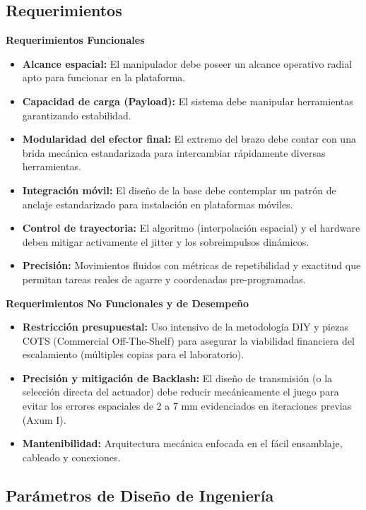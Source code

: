 \documentclass[12pt, a4paper]{article}
\begin{document}
\subsection{Requerimientos}

\textbf{Requerimientos Funcionales}
\begin{itemize}
    \item \textbf{Alcance espacial:} El manipulador debe poseer un alcance operativo radial apto para funcionar en la plataforma. 
    \item \textbf{Capacidad de carga (Payload):} El sistema debe manipular herramientas garantizando estabilidad.
    \item \textbf{Modularidad del efector final:} El extremo del brazo debe contar con una brida mecánica estandarizada para intercambiar rápidamente diversas herramientas.
    \item \textbf{Integración móvil:} El diseño de la base debe contemplar un patrón de anclaje estandarizado para instalación en plataformas móviles.
    \item \textbf{Control de trayectoria:} El algoritmo (interpolación espacial) y el hardware deben mitigar activamente el jitter y los sobreimpulsos dinámicos.
    \item \textbf{Precisión:} Movimientos fluidos con métricas de repetibilidad y exactitud que permitan tareas reales de agarre y coordenadas pre-programadas.
\end{itemize}

\textbf{Requerimientos No Funcionales y de Desempeño}
\begin{itemize}
    \item \textbf{Restricción presupuestal:} Uso intensivo de la metodología DIY y piezas COTS (Commercial Off-The-Shelf) para asegurar la viabilidad financiera del escalamiento (múltiples copias para el laboratorio).
    \item \textbf{Precisión y mitigación de Backlash:} El diseño de transmisión (o la selección directa del actuador) debe reducir mecánicamente el juego para evitar los errores espaciales de 2 a 7 mm evidenciados en iteraciones previas (Axum I).
    \item \textbf{Mantenibilidad:} Arquitectura mecánica enfocada en el fácil ensamblaje, cableado y conexiones.
\end{itemize}

\subsection{Parámetros de Diseño de Ingeniería}
\end{document}
